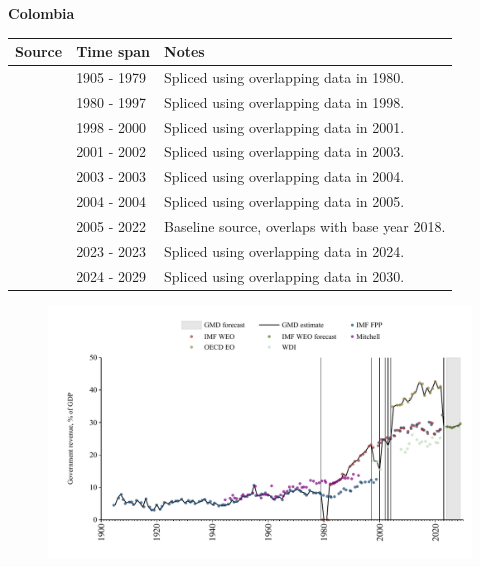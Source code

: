 \documentclass[12pt,a4paper,landscape]{article}
\begin{document}
\begin{adjustbox}{max totalsize={\paperwidth}{\paperheight},center}
\begin{minipage}[t][\textheight][t]{\textwidth}
\vspace*{0.5cm}
{}
\begin{center}
{\Large\bfseries Colombia}
\end{center}
\vspace{0.5cm}
\begin{table}[H]
\centering
\small
\begin{tabular}{|l|l|l|}
\hline
\textbf{Source} & \textbf{Time span} & \textbf{Notes} \\
\hline
\rowcolor{white}\cite{IMF_FPP}& 1905 - 1979 &Spliced using overlapping data in 1980.\\
\rowcolor{lightgray}\cite{IMF_WEO}& 1980 - 1997 &Spliced using overlapping data in 1998.\\
\rowcolor{white}\cite{WDI}& 1998 - 2000 &Spliced using overlapping data in 2001.\\
\rowcolor{lightgray}\cite{IMF_WEO}& 2001 - 2002 &Spliced using overlapping data in 2003.\\
\rowcolor{white}\cite{WDI}& 2003 - 2003 &Spliced using overlapping data in 2004.\\
\rowcolor{lightgray}\cite{IMF_WEO}& 2004 - 2004 &Spliced using overlapping data in 2005.\\
\rowcolor{white}\cite{OECD_EO}& 2005 - 2022 &Baseline source, overlaps with base year 2018.\\
\rowcolor{lightgray}\cite{WDI}& 2023 - 2023 &Spliced using overlapping data in 2024.\\
\rowcolor{white}\cite{IMF_WEO_forecast}& 2024 - 2029 &Spliced using overlapping data in 2030.\\
\hline
\end{tabular}
\end{table}
\begin{figure}[H]
\centering
\includegraphics[width=\textwidth,height=0.6\textheight,keepaspectratio]{graphs/COL_govrev_GDP.pdf}
\end{figure}
\end{minipage}
\end{adjustbox}
\end{document}
